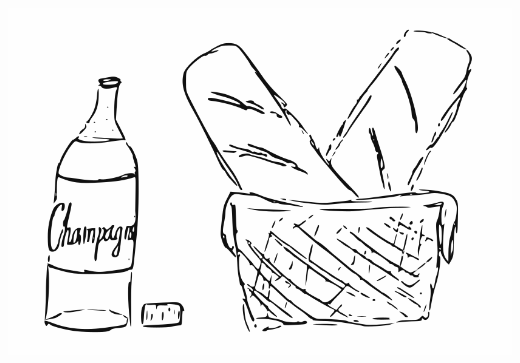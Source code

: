 \sclearpage
\begin{intersong}
\begin{center}
\includegraphics[scale=0.5]{../bilder/batongochvin.png} 
\end{center}
\end{intersong}

